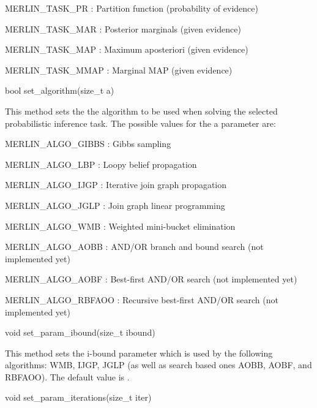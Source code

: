 \begin{DoxyItemize}
\item {\ttfamily M\+E\+R\+L\+I\+N\+\_\+\+T\+A\+S\+K\+\_\+\+PR} \+: Partition function (probability of evidence)
\item {\ttfamily M\+E\+R\+L\+I\+N\+\_\+\+T\+A\+S\+K\+\_\+\+M\+AR} \+: Posterior marginals (given evidence)
\item {\ttfamily M\+E\+R\+L\+I\+N\+\_\+\+T\+A\+S\+K\+\_\+\+M\+AP} \+: Maximum aposteriori (given evidence)
\item {\ttfamily M\+E\+R\+L\+I\+N\+\_\+\+T\+A\+S\+K\+\_\+\+M\+M\+AP} \+: Marginal M\+AP (given evidence) \begin{DoxyVerb}  bool set_algorithm(size_t a)
\end{DoxyVerb}
 This method sets the the algorithm to be used when solving the selected probabilistic inference task. The possible values for the {\ttfamily a} parameter are\+:
\item {\ttfamily M\+E\+R\+L\+I\+N\+\_\+\+A\+L\+G\+O\+\_\+\+G\+I\+B\+BS} \+: Gibbs sampling
\item {\ttfamily M\+E\+R\+L\+I\+N\+\_\+\+A\+L\+G\+O\+\_\+\+L\+BP} \+: Loopy belief propagation
\item {\ttfamily M\+E\+R\+L\+I\+N\+\_\+\+A\+L\+G\+O\+\_\+\+I\+J\+GP} \+: Iterative join graph propagation
\item {\ttfamily M\+E\+R\+L\+I\+N\+\_\+\+A\+L\+G\+O\+\_\+\+J\+G\+LP} \+: Join graph linear programming
\item {\ttfamily M\+E\+R\+L\+I\+N\+\_\+\+A\+L\+G\+O\+\_\+\+W\+MB} \+: Weighted mini-\/bucket elimination
\item {\ttfamily M\+E\+R\+L\+I\+N\+\_\+\+A\+L\+G\+O\+\_\+\+A\+O\+BB} \+: A\+N\+D/\+OR branch and bound search (not implemented yet)
\item {\ttfamily M\+E\+R\+L\+I\+N\+\_\+\+A\+L\+G\+O\+\_\+\+A\+O\+BF} \+: Best-\/first A\+N\+D/\+OR search (not implemented yet)
\item {\ttfamily M\+E\+R\+L\+I\+N\+\_\+\+A\+L\+G\+O\+\_\+\+R\+B\+F\+A\+OO} \+: Recursive best-\/first A\+N\+D/\+OR search (not implemented yet) \begin{DoxyVerb}  void set_param_ibound(size_t ibound)
\end{DoxyVerb}
 This method sets the i-\/bound parameter which is used by the following algorithms\+: {\ttfamily W\+MB}, {\ttfamily I\+J\+GP}, {\ttfamily J\+G\+LP} (as well as search based ones {\ttfamily A\+O\+BB}, {\ttfamily A\+O\+BF}, and {\ttfamily R\+B\+F\+A\+OO}). The default value is {}. \begin{DoxyVerb}    void set_param_iterations(size_t iter)

\end{DoxyVerb}
\end{DoxyItemize}
